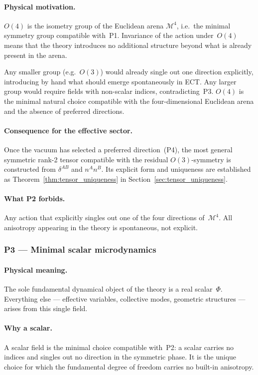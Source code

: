 \documentclass[11pt,a4paper]{article}
\numberwithin{equation}{section}
\begin{document}
\paragraph{Physical motivation.}
$O(4)$ is the isometry group of the Euclidean arena $\mathcal{M}^4$,
i.e.\ the minimal symmetry group compatible with~P1.
Invariance of the action under~$O(4)$ means that the theory introduces
no additional structure beyond what is already present in the arena.

Any smaller group (e.g.\ $O(3)$) would already single out one direction
explicitly, introducing by hand what should emerge spontaneously in ECT.
Any larger group would require fields with non-scalar indices,
contradicting~P3.
$O(4)$ is the minimal natural choice compatible with the
four-dimensional Euclidean arena and the absence of preferred directions.

\paragraph{Consequence for the effective sector.}
Once the vacuum has selected a preferred direction~(P4),
the most general symmetric rank-2 tensor compatible with the
residual $O(3)$-symmetry is constructed from $\delta^{AB}$ and $n^A n^B$.
Its explicit form and uniqueness are established as
Theorem~\ref{thm:tensor_uniqueness} in Section~\ref{sec:tensor_uniqueness}.

\paragraph{What P2 forbids.}
Any action that explicitly singles out one of the four directions
of~$\mathcal{M}^4$. All anisotropy appearing in the theory is
spontaneous, not explicit.

\subsubsection*{P3 --- Minimal scalar microdynamics}

\paragraph{Physical meaning.}
The sole fundamental dynamical object of the theory is a real
scalar~$\Phi$. Everything else --- effective variables, collective
modes, geometric structures --- arises from this single field.

\paragraph{Why a scalar.}
A scalar field is the minimal choice compatible with~P2: a scalar
carries no indices and singles out no direction in the symmetric phase.
It is the unique choice for which the fundamental degree of freedom
carries no built-in anisotropy.
\end{document}
